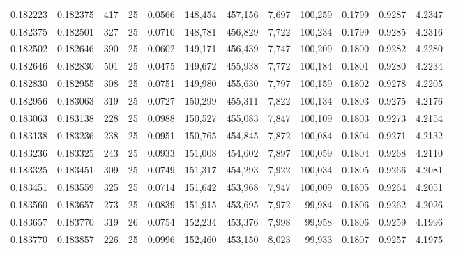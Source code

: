 \begin{tabular}{rrrrrrrrrrrrr}
0.182223 & 0.182375 &   417 &  25 &                                     0.0566 & 148,454 & 457,156 &   7,697 & 100,259 & 0.1799 & 0.9287 & 4.2347 \\
0.182375 & 0.182501 &   327 &  25 &                                     0.0710 & 148,781 & 456,829 &   7,722 & 100,234 & 0.1799 & 0.9285 & 4.2316 \\
0.182502 & 0.182646 &   390 &  25 &                                     0.0602 & 149,171 & 456,439 &   7,747 & 100,209 & 0.1800 & 0.9282 & 4.2280 \\
0.182646 & 0.182830 &   501 &  25 &                                     0.0475 & 149,672 & 455,938 &   7,772 & 100,184 & 0.1801 & 0.9280 & 4.2234 \\
0.182830 & 0.182955 &   308 &  25 &                                     0.0751 & 149,980 & 455,630 &   7,797 & 100,159 & 0.1802 & 0.9278 & 4.2205 \\
0.182956 & 0.183063 &   319 &  25 &                                     0.0727 & 150,299 & 455,311 &   7,822 & 100,134 & 0.1803 & 0.9275 & 4.2176 \\
0.183063 & 0.183138 &   228 &  25 &                                     0.0988 & 150,527 & 455,083 &   7,847 & 100,109 & 0.1803 & 0.9273 & 4.2154 \\
0.183138 & 0.183236 &   238 &  25 &                                     0.0951 & 150,765 & 454,845 &   7,872 & 100,084 & 0.1804 & 0.9271 & 4.2132 \\
0.183236 & 0.183325 &   243 &  25 &                                     0.0933 & 151,008 & 454,602 &   7,897 & 100,059 & 0.1804 & 0.9268 & 4.2110 \\
0.183325 & 0.183451 &   309 &  25 &                                     0.0749 & 151,317 & 454,293 &   7,922 & 100,034 & 0.1805 & 0.9266 & 4.2081 \\
0.183451 & 0.183559 &   325 &  25 &                                     0.0714 & 151,642 & 453,968 &   7,947 & 100,009 & 0.1805 & 0.9264 & 4.2051 \\
0.183560 & 0.183657 &   273 &  25 &                                     0.0839 & 151,915 & 453,695 &   7,972 &  99,984 & 0.1806 & 0.9262 & 4.2026 \\
0.183657 & 0.183770 &   319 &  26 &                                     0.0754 & 152,234 & 453,376 &   7,998 &  99,958 & 0.1806 & 0.9259 & 4.1996 \\
0.183770 & 0.183857 &   226 &  25 &                                     0.0996 & 152,460 & 453,150 &   8,023 &  99,933 & 0.1807 & 0.9257 & 4.1975 \\

\end{tabular}
